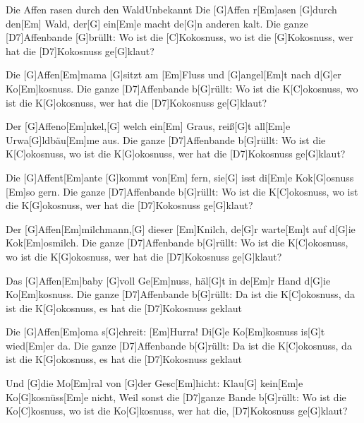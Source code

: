 \documentclass[../main.tex]{subfiles}
\begin{document}
\begin{song}[2]{Die Affen rasen durch den Wald}{Unbekannt}{}
Die [G]Affen r[Em]asen [G]durch den[Em] Wald, der[G] ein[Em]e macht de[G]n anderen kalt.
Die ganze [D7]Affenbande [G]brüllt: Wo ist die [C]Kokosnuss, wo ist die [G]Kokosnuss, wer hat die
[D7]Kokosnuss ge[G]klaut?

Die [G]Affen[Em]mama [G]sitzt am [Em]Fluss und [G]angel[Em]t nach d[G]er Ko[Em]kosnuss.
Die ganze [D7]Affenbande b[G]rüllt: Wo ist die K[C]okosnuss, wo ist die K[G]okosnuss, wer hat die
[D7]Kokosnuss ge[G]klaut?

Der [G]Affeno[Em]nkel,[G] welch ein[Em] Graus, reiß[G]t all[Em]e Urwa[G]ldbäu[Em]me aus.
Die ganze [D7]Affenbande b[G]rüllt: Wo ist die K[C]okosnuss, wo ist die K[G]okosnuss, wer hat die
[D7]Kokosnuss ge[G]klaut?

Die [G]Affent[Em]ante [G]kommt von[Em] fern, sie[G] isst di[Em]e Kok[G]osnuss [Em]so gern.
Die ganze [D7]Affenbande b[G]rüllt: Wo ist die K[C]okosnuss, wo ist die K[G]okosnuss, wer hat die
[D7]Kokosnuss ge[G]klaut?

Der [G]Affen[Em]milchmann,[G] dieser [Em]Knilch, de[G]r warte[Em]t auf d[G]ie Kok[Em]osmilch.
Die ganze [D7]Affenbande b[G]rüllt: Wo ist die K[C]okosnuss, wo ist die K[G]okosnuss, wer hat die
[D7]Kokosnuss ge[G]klaut?

Das [G]Affen[Em]baby [G]voll Ge[Em]nuss, häl[G]t in de[Em]r Hand d[G]ie Ko[Em]kosnuss.
Die ganze [D7]Affenbande b[G]rüllt: Da ist die K[C]okosnuss, da ist die K[G]okosnuss, es hat die 
[D7]Kokosnuss geklaut

Die [G]Affen[Em]oma s[G]chreit: [Em]\glqq{}Hurra! Di[G]e Ko[Em]kosnuss is[G]t wied[Em]er da\grqq{}.
Die ganze [D7]Affenbande b[G]rüllt: Da ist die K[C]okosnuss, da ist die K[G]okosnuss, es hat die 
[D7]Kokosnuss geklaut

Und [G]die Mo[Em]ral von [G]der Gesc[Em]hicht: Klau[G] kein[Em]e Ko[G]kosnüss[Em]e nicht,
Weil sonst die [D7]ganze Bande b[G]rüllt: Wo ist die Ko[C]kosnuss, wo ist die Ko[G]kosnuss, wer hat die,
[D7]Kokosnuss ge[G]klaut?
\end{song}
\end{document}
